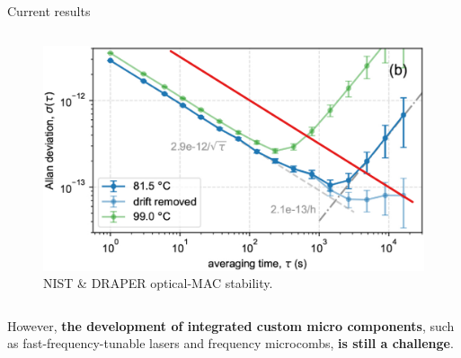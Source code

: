 \begin{frame}{Current results}
\begin{columns}[T, onlytextwidth]
        \begin{column}{0.55\textwidth}

            \begin{figure}
                \centering
                \includegraphics[width=\textwidth]{img/NIST-DRAPER-stability.png}
                \caption{NIST \& DRAPER optical-MAC stability.}
            \end{figure}
        \end{column}

    \end{columns}

    However, \textbf{the development of integrated custom micro components}, such as fast-frequency-tunable lasers and frequency microcombs, \textbf{is still a challenge}.

\end{frame}
